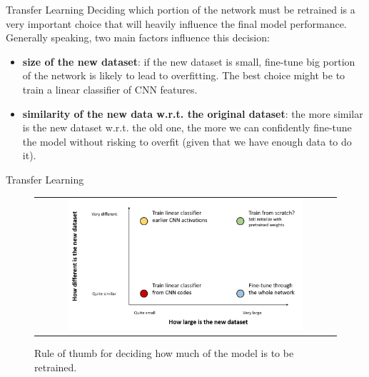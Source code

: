 \documentclass[aspectratio=169]{beamer}
\begin{document}

\begin{frame}{Transfer Learning}
Deciding which portion of the network must be retrained is a very important choice that will heavily influence the final model performance.\\
\vspace{0.5cm}
Generally speaking, two main factors influence this decision:
\begin{itemize}
\item \textbf{size of the new dataset}: if the new dataset is small, fine-tune big portion of the network is likely to lead to overfitting. The best choice might be to train a linear classifier of CNN features.
\item \textbf{similarity of the new data w.r.t. the original dataset}: the more similar is the new dataset w.r.t. the old one, the more we can confidently fine-tune the model without risking to overfit (given that we have enough data to do it).
\end{itemize}
\end{frame}


\begin{frame}{Transfer Learning}
\begin{figure}
\begin{tabular}{c}
\includegraphics[width=0.8\textwidth]{img/cnn/finetuning_rules.png}
\end{tabular}
\caption{Rule of thumb for deciding how much of the model is to be retrained.}
\end{figure}
\end{frame}

\end{document}
